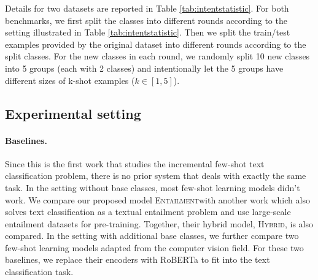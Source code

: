 \documentclass[11pt]{article}
\newcommand{\modelname}{\textsc{Entailment}}
\newcommand{\hybrid}{\textsc{Hybrid}}
\begin{document}
Details for two datasets are reported in Table \ref{tab:intentstatistic}. For both benchmarks, we first split the classes into different rounds according to the setting illustrated in Table \ref{tab:intentstatistic}. Then we split the train/test examples provided by the original dataset into different rounds according to the split classes. For the new classes in each round, we randomly split 10 new classes into 5 groups (each with 2 classes) and intentionally let the 5 groups have different sizes of k-shot examples ($k\in [1,5]$).




\subsection{Experimental setting}
\paragraph{Baselines.} 
Since this is the first work that studies the incremental few-shot text classification problem, there is no prior system that deals with exactly the same task. In the setting without base classes, most few-shot learning models didn't work. We compare our proposed model \modelname\enspace with another work \cite{zhangdiscriminative} which also solves text classification as a textual entailment problem and use large-scale entailment datasets for pre-training. Together, their hybrid model, \hybrid, is also compared. In the setting with additional base classes, we further compare two few-shot learning models \cite{DBLPSnellSZ17, DBLPGidarisK18} adapted from the computer vision field. For these two baselines, we replace their encoders with RoBERTa to fit into the text classification task.
\end{document}
